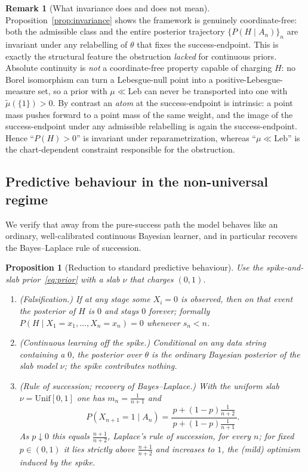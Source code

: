\documentclass{amsart}
\newtheorem{proposition}{Proposition}
\theoremstyle{definition}
\newtheorem{remark}{Remark}
\begin{document}
\begin{remark}[What invariance does and does not mean]\label{rem:invariance}
Proposition~\ref{prop:invariance} shows the framework is genuinely
coordinate-free: both the admissible class and the entire posterior trajectory
$\{P(H\mid A_n)\}_n$ are invariant under any relabelling of $\theta$ that fixes
the success-endpoint. This is exactly the structural feature the obstruction
\emph{lacked} for continuous priors. Absolute continuity is \emph{not} a
coordinate-free property capable of charging $H$: no Borel isomorphism can turn a
Lebesgue-null point into a positive-Lebesgue-measure set, so a prior with
$\mu\ll\mathrm{Leb}$ can never be transported into one with $\tilde\mu(\{1\})>0$.
By contrast an \emph{atom} at the success-endpoint is intrinsic: a point mass
pushes forward to a point mass of the same weight, and the image of the
success-endpoint under any admissible relabelling is again the success-endpoint.
Hence ``$P(H)>0$'' is invariant under reparametrization, whereas
``$\mu\ll\mathrm{Leb}$'' is the chart-dependent constraint responsible for the
obstruction.
\end{remark}

\subsection{Predictive behaviour in the non-universal regime}
We verify that away from the pure-success path the model behaves like an
ordinary, well-calibrated continuous Bayesian learner, and in particular
recovers the Bayes--Laplace rule of succession.

\begin{proposition}[Reduction to standard predictive behaviour]\label{prop:predictive}
Use the spike-and-slab prior~\eqref{eq:prior} with a slab $\nu$ that charges
$(0,1)$.
\begin{enumerate}
\item[\textup{(a)}] \emph{(Falsification.)} If at any stage some $X_i=0$ is
observed, then on that event the posterior of $H$ is $0$ and stays $0$ forever;
formally $P(H\mid X_1=x_1,\dots,X_n=x_n)=0$ whenever $s_n<n$.
\item[\textup{(b)}] \emph{(Continuous learning off the spike.)} Conditional on
any data string containing a $0$, the posterior over $\theta$ is the ordinary
Bayesian posterior of the slab model $\nu$; the spike contributes nothing.
\item[\textup{(c)}] \emph{(Rule of succession; recovery of Bayes--Laplace.)}
With the uniform slab $\nu=\mathrm{Unif}[0,1]$ one has $m_n=\frac1{n+1}$ and
\[
  P(X_{n+1}=1\mid A_n)=\frac{p+(1-p)\frac{1}{n+2}}{\,p+(1-p)\frac{1}{n+1}\,}.
\]
As $p\downarrow0$ this equals $\tfrac{n+1}{n+2}$, Laplace's rule of succession,
for every $n$; for fixed $p\in(0,1)$ it lies strictly above $\tfrac{n+1}{n+2}$
and increases to $1$, the (mild) optimism induced by the spike.
\end{enumerate}
\end{proposition}
\end{document}
